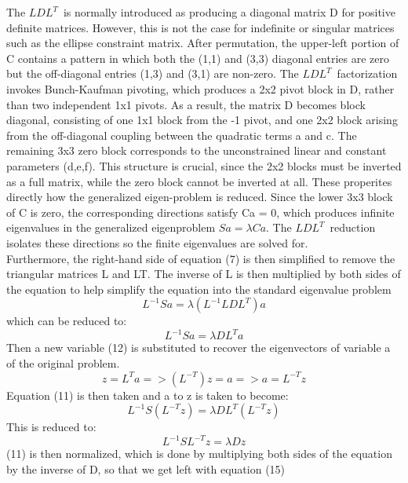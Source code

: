 \documentclass[11pt,a4paper]{article}
\begin{document}
The $LDL^{T}\,$ is normally introduced as producing a diagonal matrix D for positive definite matrices. However, this is not the case for indefinite or singular matrices such as the ellipse constraint matrix. After permutation, the upper-left portion of C contains a pattern in which both the (1,1) and (3,3) diagonal entries are zero but the off-diagonal entries (1,3) and (3,1) are non-zero. The $LDL^{T}\,$ factorization invokes Bunch-Kaufman pivoting, which produces a 2x2 pivot block in D, rather than two independent 1x1 pivots. As a result, the matrix D becomes block diagonal, consisting of one 1x1 block from the -1 pivot, and one 2x2 block arising from the off-diagonal coupling between the quadratic terms a and c. The remaining 3x3 zero block corresponds to the unconstrained linear and constant parameters (d,e,f). This structure is crucial, since the 2x2 blocks must be inverted as a full matrix, while the zero block cannot be inverted at all. These properites directly how the generalized eigen-problem is reduced. Since the lower 3x3 block of C is zero, the corresponding directions satisfy Ca = 0, which produces infinite eigenvalues in the generalized eigenproblem $Sa = {\lambda}Ca$. The $LDL^{T}\,$ reduction isolates these directions so the finite eigenvalues are solved for. 
\\Furthermore, the right-hand side of equation (7) is then simplified to remove the triangular matrices L and LT. The inverse of L is then multiplied by both sides of the equation to help simplify the equation into the standard eigenvalue problem
\begin{equation}
    L^{-1}Sa = \lambda (L^{-1} LDL^{T})a 
\end{equation}
which can be reduced to: 
\begin{equation}
    L^{-1}Sa = \lambda DL^{T}a
\end{equation}
Then a new variable (12) is substituted to recover the eigenvectors of variable a of the original problem. 
\begin{equation}
    z = L^{T}a => (L^{-T})z = a => a = L^{-T}z
\end{equation}
Equation (11) is then taken and a to z is taken to become: 
\begin{equation}
    L^{-1} S(L^{-T}z) = \lambda DL^{T}(L^{-T}z)
\end{equation}
This is reduced to: 
\begin{equation}
    L^{-1}SL^{-T}z = \lambda Dz
\end{equation}
 (11) is then normalized, which is done by multiplying both sides of the equation by the inverse of D, so that we get left with equation (15)
\end{document}
